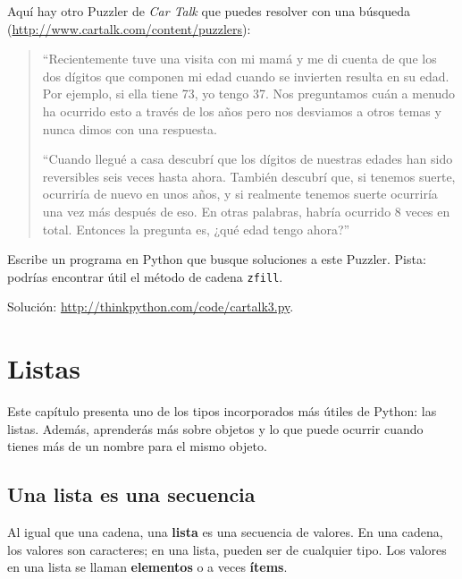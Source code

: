 \documentclass[10pt]{book}
\begin{document}
\begin{exercise}
Aquí hay otro Puzzler de {\em Car Talk} que puedes resolver con una
búsqueda (\url{http://www.cartalk.com/content/puzzlers}):

\begin{quote}
``Recientemente tuve una visita con mi mamá y me di cuenta de que
los dos dígitos que componen mi edad cuando se invierten resulta en su
edad. Por ejemplo, si ella tiene 73, yo tengo 37. Nos preguntamos cuán a menudo ha
ocurrido esto a través de los años pero nos desviamos a otros temas y
nunca dimos con una respuesta.

``Cuando llegué a casa descubrí que los dígitos de nuestras edades han sido
reversibles seis veces hasta ahora. También descubrí que, si tenemos suerte,
ocurriría de nuevo en unos años, y si realmente tenemos suerte
ocurriría una vez más después de eso. En otras palabras, habría
ocurrido 8 veces en total. Entonces la pregunta es, ¿qué edad tengo ahora?''

\end{quote}

Escribe un programa en Python que busque soluciones a este Puzzler.
Pista: podrías encontrar útil el método de cadena {\tt zfill}.

Solución: \url{http://thinkpython.com/code/cartalk3.py}.

\end{exercise}



\chapter{Listas}

Este capítulo presenta uno de los tipos incorporados más útiles de Python: las listas.
Además, aprenderás más sobre objetos y lo que puede ocurrir cuando tienes
más de un nombre para el mismo objeto.


\section{Una lista es una secuencia}
\label{sequence}

Al igual que una cadena, una {\bf lista} es una secuencia de valores.  En una cadena, los
valores son caracteres; en una lista, pueden ser de cualquier tipo.  Los valores en
una lista se llaman {\bf elementos} o a veces {\bf ítems}.
\end{document}
